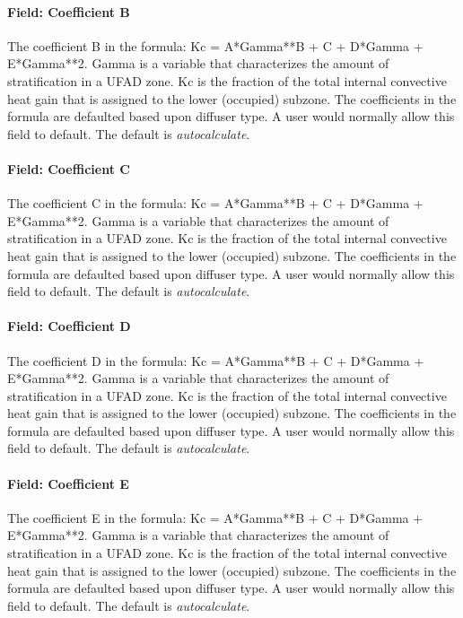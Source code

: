 \paragraph{Field: Coefficient B}\label{field-coefficient-b}

The coefficient B in the formula: Kc = A*Gamma**B + C + D*Gamma + E*Gamma**2. Gamma is a variable that characterizes the amount of stratification in a UFAD zone. Kc is the fraction of the total internal convective heat gain that is assigned to the lower (occupied) subzone. The coefficients in the formula are defaulted based upon diffuser type. A user would normally allow this field to default. The default is \emph{autocalculate}.

\paragraph{Field: Coefficient C}\label{field-coefficient-c}

The coefficient C in the formula: Kc = A*Gamma**B + C + D*Gamma + E*Gamma**2. Gamma is a variable that characterizes the amount of stratification in a UFAD zone. Kc is the fraction of the total internal convective heat gain that is assigned to the lower (occupied) subzone. The coefficients in the formula are defaulted based upon diffuser type. A user would normally allow this field to default. The default is \emph{autocalculate}.

\paragraph{Field: Coefficient D}\label{field-coefficient-d}

The coefficient D in the formula: Kc = A*Gamma**B + C + D*Gamma + E*Gamma**2. Gamma is a variable that characterizes the amount of stratification in a UFAD zone. Kc is the fraction of the total internal convective heat gain that is assigned to the lower (occupied) subzone. The coefficients in the formula are defaulted based upon diffuser type. A user would normally allow this field to default. The default is \emph{autocalculate}.

\paragraph{Field: Coefficient E}\label{field-coefficient-e}

The coefficient E in the formula: Kc = A*Gamma**B + C + D*Gamma + E*Gamma**2. Gamma is a variable that characterizes the amount of stratification in a UFAD zone. Kc is the fraction of the total internal convective heat gain that is assigned to the lower (occupied) subzone. The coefficients in the formula are defaulted based upon diffuser type. A user would normally allow this field to default. The default is \emph{autocalculate}.

